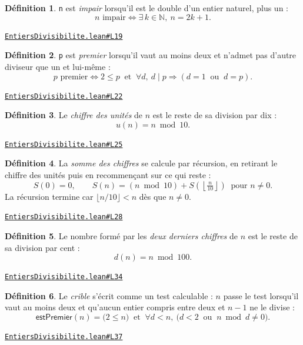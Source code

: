 \documentclass[11pt,a4paper]{article}
\theoremstyle{definition}
\newtheorem{definition}{Définition}
\theoremstyle{plain}
\newcommand{\source}[2]{\par\smallskip\noindent\hfill{\footnotesize\href{#1}{\texttt{#2}}}\par\smallskip}
\begin{document}
\begin{definition}
\texttt{n} est \emph{impair} lorsqu'il est le double d'un entier naturel, plus un :
\[ n \text{ impair} \iff \exists\, k \in \mathbb{N},\ n = 2k + 1 . \]
\end{definition}
\source{https://github.com/Commutator-IO/learn-lean/blob/main/cours/01-college/01-nombres-et-calculs/EntiersDivisibilite.lean\#L19}{EntiersDivisibilite.lean\#L19}

\begin{definition}
\texttt{p} est \emph{premier} lorsqu'il vaut au moins deux et n'admet pas d'autre
diviseur que un et lui-même :
\[ p \text{ premier} \iff 2 \le p \ \text{ et } \ \forall d,\ d \mid p \Rightarrow
   (d = 1 \ \text{ ou } \ d = p) . \]
\end{definition}
\source{https://github.com/Commutator-IO/learn-lean/blob/main/cours/01-college/01-nombres-et-calculs/EntiersDivisibilite.lean\#L22}{EntiersDivisibilite.lean\#L22}

\begin{definition}
Le \emph{chiffre des unités} de $n$ est le reste de sa division par dix :
\[ u(n) = n \bmod 10 . \]
\end{definition}
\source{https://github.com/Commutator-IO/learn-lean/blob/main/cours/01-college/01-nombres-et-calculs/EntiersDivisibilite.lean\#L25}{EntiersDivisibilite.lean\#L25}

\begin{definition}
La \emph{somme des chiffres} se calcule par récursion, en retirant le chiffre des
unités puis en recommençant sur ce qui reste :
\[ S(0) = 0, \qquad
   S(n) = (n \bmod 10) + S\!\left(\left\lfloor \tfrac{n}{10} \right\rfloor\right)
   \ \text{ pour } n \ne 0 . \]
La récursion termine car $\lfloor n/10 \rfloor < n$ dès que $n \ne 0$.
\end{definition}
\source{https://github.com/Commutator-IO/learn-lean/blob/main/cours/01-college/01-nombres-et-calculs/EntiersDivisibilite.lean\#L28}{EntiersDivisibilite.lean\#L28}

\begin{definition}
Le nombre formé par les \emph{deux derniers chiffres} de $n$ est le reste de sa
division par cent :
\[ d(n) = n \bmod 100 . \]
\end{definition}
\source{https://github.com/Commutator-IO/learn-lean/blob/main/cours/01-college/01-nombres-et-calculs/EntiersDivisibilite.lean\#L34}{EntiersDivisibilite.lean\#L34}

\begin{definition}
Le \emph{crible} s'écrit comme un test calculable : $n$ passe le test lorsqu'il vaut au
moins deux et qu'aucun entier compris entre deux et $n-1$ ne le divise :
\[ \textsf{estPremier}(n) = \bigl(2 \le n\bigr) \ \text{ et } \
   \forall d < n,\ \bigl(d < 2 \ \text{ ou } \ n \bmod d \ne 0\bigr) . \]
\end{definition}
\source{https://github.com/Commutator-IO/learn-lean/blob/main/cours/01-college/01-nombres-et-calculs/EntiersDivisibilite.lean\#L37}{EntiersDivisibilite.lean\#L37}
\end{document}
